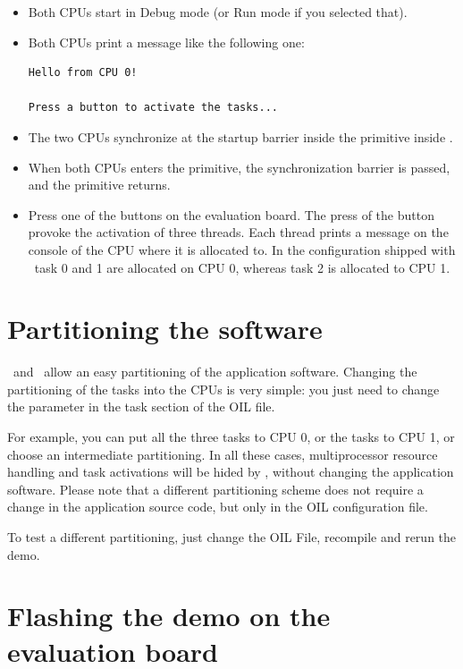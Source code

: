 \begin{itemize}
\item Both CPUs start in Debug mode (or Run mode if you selected that).
\item Both CPUs print a message like the following one:
\begin{lstlisting}
Hello from CPU 0!

Press a button to activate the tasks...
\end{lstlisting}

\item The two CPUs synchronize at the startup barrier inside the
   primitive inside .
\item When both CPUs enters the  primitive, the
  synchronization barrier is passed, and the  primitive
  returns.

\item Press one of the buttons on the evaluation board.  The press of
  the button provoke the activation of three threads. Each thread
  prints a message on the console of the CPU where it is allocated to.
  In the configuration shipped with \ee\, task 0 and 1 are
  allocated on CPU 0, whereas task 2 is allocated to CPU 1.
\end{itemize}

\section{Partitioning the software}

\rtd\ and \ee\ allow an easy partitioning of the application
software. Changing the partitioning of the tasks into the CPUs is very
simple: you just need to change the  parameter in the
task section of the OIL file.

For example, you can put all the three tasks to CPU 0, or the tasks to
CPU 1, or choose an intermediate partitioning. In all these cases,
multiprocessor resource handling and task activations will be hided by
\ee, without changing the application software.  Please note
that a different partitioning scheme does not require a change in the
application source code, but only in the OIL configuration file.

To test a different partitioning, just change the OIL File, recompile
and rerun the demo.




\section{Flashing the demo on the evaluation board}
\label{sec:flashing}

